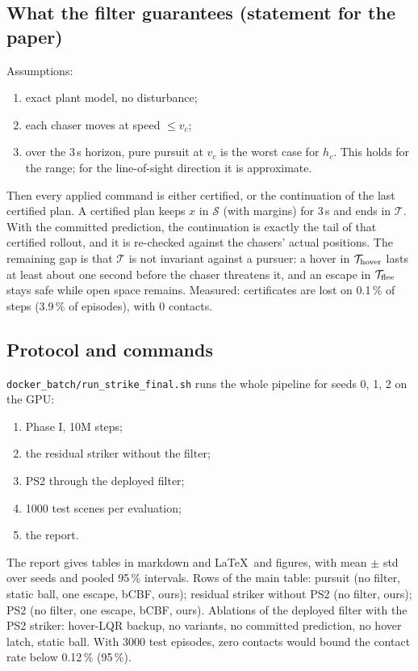 \documentclass[11pt]{article}
\newcommand{\Safe}{\mathcal{S}}
\begin{document}
\subsection{What the filter guarantees (statement for the paper)}
Assumptions:
\begin{enumerate}[label=(A\arabic*)]
\item exact plant model, no disturbance;
\item each chaser moves at speed $\le v_c$;
\item over the 3\,s horizon, pure pursuit at $v_c$ is the worst case for $h_c$. This holds for the range; for the line-of-sight direction it is approximate.
\end{enumerate}
Then every applied command is either certified, or the continuation of the last certified plan.
A certified plan keeps $x$ in $\Safe$ (with margins) for 3\,s and ends in $\mathcal T$.
With the committed prediction, the continuation is exactly the tail of that certified rollout, and it is re-checked against the chasers' actual positions.
The remaining gap is that $\mathcal T$ is not invariant against a pursuer: a hover in $\mathcal T_{\rm hover}$ lasts at least about one second before the chaser threatens it, and an escape in $\mathcal T_{\rm flee}$ stays safe while open space remains.
Measured: certificates are lost on 0.1\,\% of steps (3.9\,\% of episodes), with 0 contacts.

\subsection{Protocol and commands}
\texttt{docker\_batch/run\_strike\_final.sh} runs the whole pipeline for seeds 0, 1, 2 on the GPU:
\begin{enumerate}
\item Phase I, 10M steps;
\item the residual striker without the filter;
\item PS2 through the deployed filter;
\item 1000 test scenes per evaluation;
\item the report.
\end{enumerate}
The report gives tables in markdown and \LaTeX\ and figures, with mean $\pm$ std over seeds and pooled 95\,\% intervals.
Rows of the main table: pursuit (no filter, static ball, one escape, bCBF, ours); residual striker without PS2 (no filter, ours); PS2 (no filter, one escape, bCBF, ours).
Ablations of the deployed filter with the PS2 striker: hover-LQR backup, no variants, no committed prediction, no hover latch, static ball.
With 3000 test episodes, zero contacts would bound the contact rate below 0.12\,\% (95\,\%).
\end{document}
